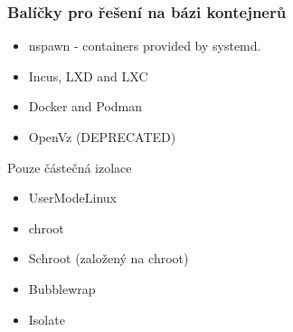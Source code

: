 \documentclass{beamer}
\begin{document}
\begin{frame}
\frametitle{Balíčky pro řešení na bázi kontejnerů}

\begin{itemize}
  \item nspawn - containers provided by systemd.
  \item Incus, LXD and LXC
  \item Docker and Podman
  \item OpenVz (DEPRECATED)
\end{itemize}

Pouze částečná izolace

\begin{itemize}
  \item UserModeLinux
  \item chroot
  \item Schroot (založený na chroot)
  \item Bubblewrap
  \item Isolate
\end{itemize}
\end{frame}
\end{document}
